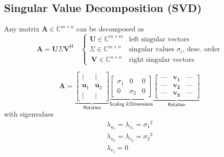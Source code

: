 
\subsection{Singular Value Decomposition (SVD)}

Any matrix $\mathbf{A}\in \mathbb{C}^{m\times n}$ can be decomposed as
\noindent\begin{equation*}
    \mathbf{A}=\mathbf{U}\Sigma \mathbf{V}^{\mathsf{H}}\quad \begin{cases}
        \mathbf{U}\in \mathbb{C}^{m\times m} & \text{left singular vectors}                          \\
        \Sigma\in \mathbb{C}^{m\times n}     & \text{singular values }\sigma_i \text{, desc.\ order} \\\
        \mathbf{V}\in \mathbb{C}^{n\times n} & \text{right singular vectors}\
    \end{cases}
\end{equation*}


\noindent\begin{equation*}
    \mathbf{A}=
    \underbrace{\begin{bmatrix}
            \vert        & \vert        \\
            \mathbf{u}_1 & \mathbf{u}_2 \\
            \vert        & \vert
        \end{bmatrix}}_{\textsf{Rotation}}
    \underbrace{\begin{bmatrix}
            \sigma_1 & 0        & 0 \\
            0        & \sigma_2 & 0
        \end{bmatrix}}_{\textsf{Scaling \& Dimensions}}
    \underbrace{\begin{bmatrix}
            \text{---} & \mathbf{v_1} & \text{---} \\
            \text{---} & \mathbf{v_2} & \text{---} \\
            \text{---} & \mathbf{v_3} & \text{---}
        \end{bmatrix}}_{\textsf{Rotation}}
\end{equation*}
with eigenvalues
\noindent\begin{gather*}
    \lambda_{u_1}=\lambda_{v_1}={\sigma_1}^2\\
    \lambda_{u_2}=\lambda_{v_2}={\sigma_2}^2\\
    \lambda_{v_3}=0
\end{gather*}

